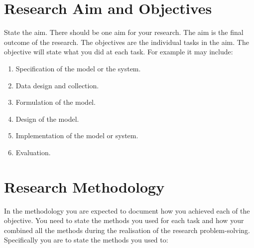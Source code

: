 \section{Research Aim and Objectives}

State the aim. There should be one aim for your research. The aim is the final outcome of the research.  The objectives are the individual tasks in the aim.  The objective will state what you did at each task. For example it may include:

\begin{enumerate}
\item Specification of the model or the system. \vspace*{-4mm}
\item Data design and collection. \vspace*{-4mm}
\item Formulation of the model. \vspace*{-4mm}
\item Design of the model. \vspace*{-4mm}
\item Implementation of the model or system. \vspace*{-4mm}
\item Evaluation. 
\end{enumerate}

\section{Research Methodology}
In the methodology you are expected to document how you achieved each of the objective. You need to state the methods you used for each task and how your combined all the methods during the realisation of the research problem-solving. Specifically you are to state the methods you used to:
  
